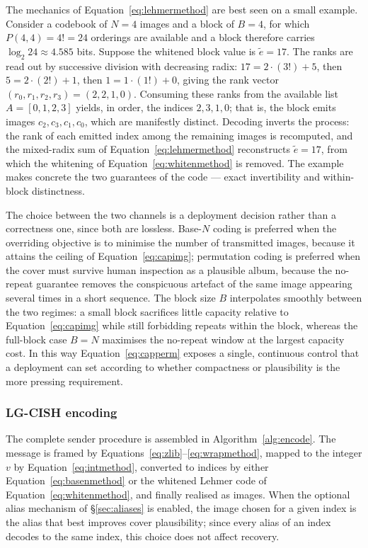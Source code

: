 \documentclass[11pt]{article}
\theoremstyle{definition}
\newcommand{\Eqn}[1]{Equation~\eqref{#1}}
\newcommand{\Eqns}[2]{Equations~\eqref{#1}--\eqref{#2}}
\begin{document}
The mechanics of \Eqn{eq:lehmermethod} are best seen on a small example. Consider a
codebook of $N=4$ images and a block of $B=4$, for which $P(4,4)=4!=24$ orderings
are available and a block therefore carries $\log_2 24\approx 4.585$ bits. Suppose
the whitened block value is $\tilde e=17$. The ranks are read out by successive
division with decreasing radix: $17 = 2\cdot(3!) + 5$, then $5 = 2\cdot(2!) + 1$,
then $1 = 1\cdot(1!) + 0$, giving the rank vector $(r_0,r_1,r_2,r_3)=(2,2,1,0)$.
Consuming these ranks from the available list $A=[0,1,2,3]$ yields, in order, the
indices $2,3,1,0$; that is, the block emits images $c_2,c_3,c_1,c_0$, which are
manifestly distinct. Decoding inverts the process: the rank of each emitted index
among the remaining images is recomputed, and the mixed-radix sum of
\Eqn{eq:lehmermethod} reconstructs $\tilde e=17$, from which the whitening of
\Eqn{eq:whitenmethod} is removed. The example makes concrete the two guarantees of
the code --- exact invertibility and within-block distinctness.

The choice between the two channels is a deployment decision rather than a
correctness one, since both are lossless. Base-$N$ coding is preferred when the
overriding objective is to minimise the number of transmitted images, because it
attains the ceiling of \Eqn{eq:capimg}; permutation coding is preferred when the
cover must survive human inspection as a plausible album, because the no-repeat
guarantee removes the conspicuous artefact of the same image appearing several times
in a short sequence. The block size $B$ interpolates smoothly between the two
regimes: a small block sacrifices little capacity relative to \Eqn{eq:capimg} while
still forbidding repeats within the block, whereas the full-block case $B=N$ maximises
the no-repeat window at the largest capacity cost. In this way \Eqn{eq:capperm}
exposes a single, continuous control that a deployment can set according to whether
compactness or plausibility is the more pressing requirement.

\subsubsection{LG-CISH encoding}\label{sec:encode}
The complete sender procedure is assembled in Algorithm~\ref{alg:encode}. The
message is framed by \Eqns{eq:zlib}{eq:wrapmethod}, mapped to the integer $v$
by \Eqn{eq:intmethod}, converted to indices by either \Eqn{eq:basenmethod} or the
whitened Lehmer code of \Eqn{eq:whitenmethod}, and finally realised as images. When
the optional alias mechanism of \S\ref{sec:aliases} is enabled, the image chosen
for a given index is the alias that best improves cover plausibility; since every
alias of an index decodes to the same index, this choice does not affect recovery.
\end{document}
